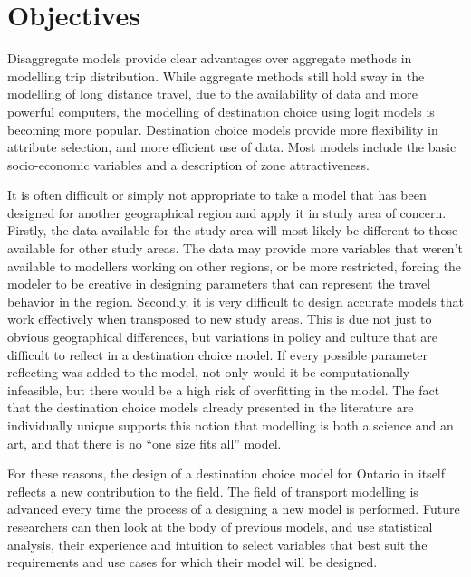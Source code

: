 \section{Objectives}
Disaggregate models provide clear advantages over aggregate methods in modelling trip distribution. While aggregate methods still hold sway in the modelling of long distance travel, due to the availability of data and more powerful computers, the modelling of destination choice using logit models is becoming more popular. Destination choice models provide more flexibility in attribute selection, and more efficient use of data. Most models include the basic socio-economic variables and a description of zone attractiveness. 

It is often difficult or simply not appropriate to take a model that has been designed for another geographical region and apply it in study area of concern. Firstly, the data available for the study area will most likely be different to those available for other study areas. The data may provide more variables that weren't available to modellers working on other regions, or be more restricted, forcing the modeler to be creative in designing parameters that can represent the travel behavior in the region. Secondly, it is very difficult to design accurate models that work effectively when transposed to new study areas. This is due not just to obvious geographical differences, but variations in policy and culture that are difficult to reflect in a destination choice model. If every possible parameter reflecting was added to the model, not only would it be computationally infeasible, but there would be a high risk of overfitting in the model. The fact that the destination choice models already presented in the literature are individually unique supports this notion that modelling is both a science and an art, and that there is no \enquote{one size fits all} model.

For these reasons, the design of a destination choice model for Ontario in itself reflects a new contribution to the field.  The field of transport modelling is advanced every time the process of a designing a new model is performed. Future researchers can then look at the body of previous models, and use statistical analysis, their experience and intuition to select variables that best suit the requirements and use cases for which their model will be designed. 

